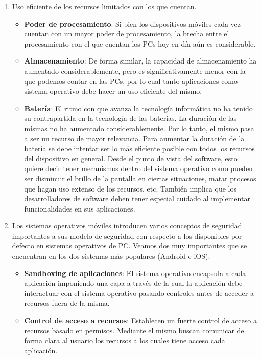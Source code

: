 \begin{enumerate}
\item Uso eficiente de los recursos limitados con los que cuentan.
    \begin{itemize}
    \item \textbf{Poder de procesamiento}: Si bien los dispositivos móviles cada vez cuentan con un mayor poder de procesamiento, la brecha entre el procesamiento con el que cuentan los PCs hoy en día aún es considerable.
    \item \textbf{Almacenamiento}: De forma similar, la capacidad de almacenamiento ha aumentado considerablemente, pero es significativamente menor con la que podemos contar en las PCs, por lo cual tanto aplicaciones como sistema operativo debe hacer un uso eficiente del mismo.
    \item \textbf{Batería}: El ritmo con que avanza la tecnología informática no ha tenido su contrapartida en la tecnología de las baterías. La duración de las mismas no ha aumentado considerablemente. Por lo tanto, el mismo pasa a ser un recurso de mayor relevancia. Para aumentar la duración de la batería se debe intentar ser lo más eficiente posible con todos los recursos del dispositivo en general. Desde el punto de vista del software, esto quiere decir tener mecanismos dentro del sistema operativo como pueden ser disminuir el brillo de la pantalla en ciertas situaciones, matar procesos que hagan uso extenso de los recursos, etc. También implica que los desarrolladores de software deben tener especial cuidado al implementar funcionalidades en sus aplicaciones.
    \end{itemize}
\item Los sistemas operativos móviles introducen varios conceptos de seguridad importantes a sus modelo de seguridad con respecto a los disponibles por defecto en sistemas operativos de PC. Veamos dos muy importantes que se encuentran en los dos sistemas más populares (Android e iOS):
    \begin{itemize}
    \item \textbf{Sandboxing de aplicaciones}: El sistema operativo encapsula a cada aplicación imponiendo una capa a través de la cual la aplicación debe interactuar con el sistema operativo pasando controles antes de acceder a recursos fuera de la misma.
    \item \textbf{Control de acceso a recursos}: Establecen un fuerte control de acceso a recursos basado en permisos. Mediante el mismo buscan comunicar de forma clara al usuario los recursos a los cuales tiene acceso cada aplicación.

\end{itemize}
\end{enumerate}
